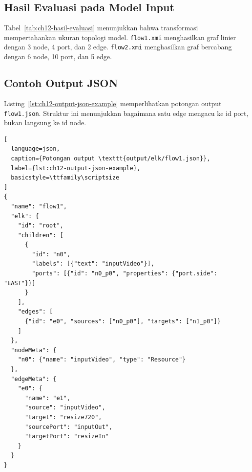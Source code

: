 \subsection{Hasil Evaluasi pada Model Input}

\begin{table}[h]
\centering
\caption{Hasil transformasi M2T pada dua model input}
\label{tab:ch12-hasil-evaluasi}
\footnotesize
{}
\normalsize
\end{table}

Tabel~\ref{tab:ch12-hasil-evaluasi} menunjukkan bahwa transformasi mempertahankan ukuran topologi model. \texttt{flow1.xmi} menghasilkan graf linier dengan 3 node, 4 port, dan 2 edge. \texttt{flow2.xmi} menghasilkan graf bercabang dengan 6 node, 10 port, dan 5 edge.

\subsection{Contoh Output JSON}

Listing~\ref{lst:ch12-output-json-example} memperlihatkan potongan output \texttt{flow1.json}. Struktur ini menunjukkan bagaimana satu edge mengacu ke id port, bukan langsung ke id node.

\begin{lstlisting}[
  language=json,
  caption={Potongan output \texttt{output/elk/flow1.json}},
  label={lst:ch12-output-json-example},
  basicstyle=\ttfamily\scriptsize
]
{
  "name": "flow1",
  "elk": {
    "id": "root",
    "children": [
      {
        "id": "n0",
        "labels": [{"text": "inputVideo"}],
        "ports": [{"id": "n0_p0", "properties": {"port.side": "EAST"}}]
      }
    ],
    "edges": [
      {"id": "e0", "sources": ["n0_p0"], "targets": ["n1_p0"]}
    ]
  },
  "nodeMeta": {
    "n0": {"name": "inputVideo", "type": "Resource"}
  },
  "edgeMeta": {
    "e0": {
      "name": "e1",
      "source": "inputVideo",
      "target": "resize720",
      "sourcePort": "inputOut",
      "targetPort": "resizeIn"
    }
  }
}
\end{lstlisting}

